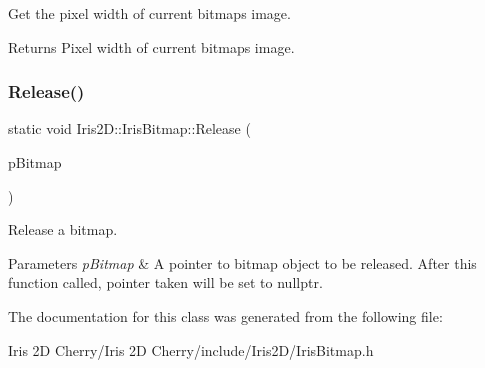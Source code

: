 Get the pixel width of current bitmap\textquotesingle{}s image. 

\begin{DoxyReturn}{Returns}
Pixel width of current bitmap\textquotesingle{}s image. 
\end{DoxyReturn}
\mbox{\label{class_iris2_d_1_1_iris_bitmap_a30f09c40ae048de40f06c0a1d6575441}} 
\subsubsection{\texorpdfstring{Release()}{Release()}}
{\footnotesize\ttfamily static void Iris2\+D\+::\+Iris\+Bitmap\+::\+Release (\begin{DoxyParamCaption}\item[{\hyperlink{class_iris2_d_1_1_iris_bitmap}{Iris\+Bitmap} $\ast$\&}]{p\+Bitmap }\end{DoxyParamCaption})\hspace{0.3cm}{\ttfamily [static]}}



Release a bitmap. 


\begin{DoxyParams}{Parameters}
{\em p\+Bitmap} & A pointer to bitmap object to be released. After this function called, pointer taken will be set to nullptr. \\
\hline
\end{DoxyParams}


The documentation for this class was generated from the following file\+:\begin{DoxyCompactItemize}
\item 
Iris 2\+D Cherry/\+Iris 2\+D Cherry/include/\+Iris2\+D/Iris\+Bitmap.\+h\end{DoxyCompactItemize}
